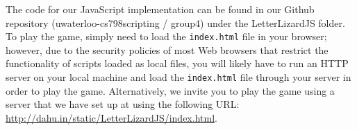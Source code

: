 The code for our JavaScript implementation can be found in our Github repository
(uwaterloo-cs798scripting / group4) under the LetterLizardJS folder. To play the
game, simply need to load the \texttt{index.html} file in your browser; however,
due to the security policies of most Web browsers that restrict the functionality
of scripts loaded as local files, you will likely have to run an
HTTP server on your local machine and load the \texttt{index.html} file through
your server in order to play the game. Alternatively, we invite you to play the
game using a server that we have set up at using the following URL: 
\url{http://dahu.in/static/LetterLizardJS/index.html}.


